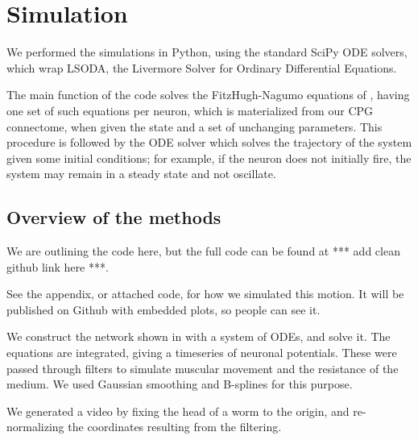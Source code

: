 \documentclass[
    11pt,
]{article}
\begin{document}
\section{Simulation}

%

We performed the simulations in Python, using the standard SciPy ODE solvers, which wrap LSODA, the Livermore Solver for Ordinary Differential Equations. %

The main function of the code solves the FitzHugh-Nagumo equations of , having one set of such equations per neuron, which is materialized from our CPG connectome, when given the state and a set of unchanging parameters.  This procedure is followed by the ODE solver which solves the trajectory of the system given some initial conditions; for example, if the neuron does not initially fire, the system may remain in a steady state and not oscillate.

\subsection{Overview of the methods}

We are outlining the code here, but the full code can be found at *** add clean github link here ***.

See the appendix, or attached code, for how we simulated this motion.  It will be published on Github with embedded plots, so people can see it.

We construct the network shown in  with a system of ODEs, and solve it. The equations are integrated, giving a timeseries of neuronal potentials.  These were passed through filters to simulate muscular movement and the resistance of the medium.  We used Gaussian smoothing and B-splines for this purpose.

We generated a video by fixing the head of a worm to the origin, and re-normalizing the coordinates resulting from the filtering.
\end{document}
